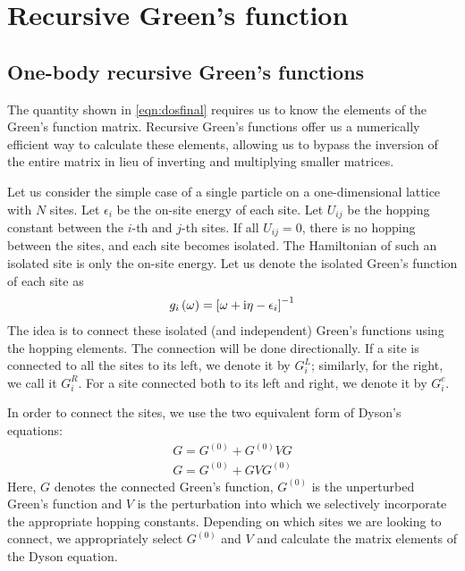 \chapter{\label{rgf}Recursive Green's function}

\setcounter{equation}{0}
\setcounter{table}{0}
\setcounter{figure}{0}

\section{One-body recursive Green's functions}
	The quantity shown in \eqref{eqn:dosfinal} requires us to know the elements of the Green's function matrix. Recursive Green's functions offer us a numerically efficient way to calculate these elements, allowing us to bypass the inversion of the entire matrix in lieu of inverting and multiplying smaller matrices.
	
	Let us consider the simple case of a single particle on a one-dimensional lattice with $ N $ sites. Let $ \epsilon_i $ be the on-site energy of each site. Let $ U_{ij} $ be the hopping constant between the $ i $-th and $ j $-th sites. If all $ U_{ij} = 0 $, there is no hopping between the sites, and each site becomes isolated. The Hamiltonian of such an isolated site is only the on-site energy. Let us denote the isolated Green's function of each site as
	\begin{align}
		g_{i} \left( \omega \right) = \left[ \omega + \mathrm{i} \eta - \epsilon_i \right]^{-1}
	\end{align}
	The idea is to connect these isolated (and independent) Green's functions using the hopping elements. The connection will be done directionally. If a site is connected to all the sites to its left, we denote it by $ G^{L}_{i} $; similarly, for the right, we call it $ G^{R}_{i} $. For a site connected both to its left and right, we denote it by $ G^{c}_i $.
	
	In order to connect the sites, we use the two equivalent form of Dyson's equations\cite{2013arXiv1304.3934L}:
	\begin{align}
		G = G^{(0)} + G^{(0)}VG\label{eqn:dysonleft}\\
		G = G^{(0)} + GVG^{(0)}\label{eqn:dysonright}
	\end{align}
	Here, $ G $ denotes the connected Green's function, $ G^{(0)} $ is the unperturbed Green's function and $ V $ is the perturbation into which we selectively incorporate the appropriate hopping constants. Depending on which sites we are looking to connect, we appropriately select $ G^{(0)} $ and $ V $ and calculate the matrix elements of the Dyson equation.
	
